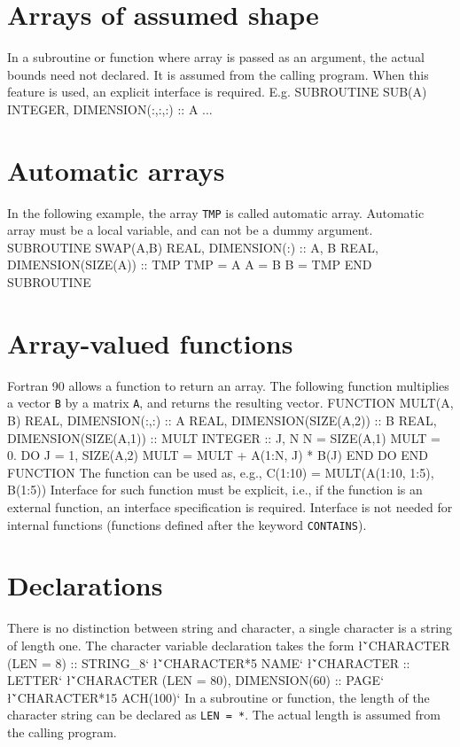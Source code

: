 {\section{Arrays of assumed shape}
In a subroutine or function where array is passed as an argument, 
the actual bounds need not declared.  It is assumed from the calling
program.  When this feature is used, an explicit interface is
required.  E.g.
\ttbg
SUBROUTINE SUB(A)
   INTEGER, DIMENSION(:,:,:) :: A
   ...
\tted

\section{Automatic arrays}
In the following example, the array {\tt TMP} is called automatic array.
Automatic array must be a local variable, and can not be a dummy
argument.
\ttbg
SUBROUTINE SWAP(A,B)
   REAL, DIMENSION(:) :: A, B
   REAL, DIMENSION(SIZE(A)) :: TMP
   TMP = A
   A = B
   B = TMP
END SUBROUTINE
\tted

\section{Array-valued functions}
Fortran 90 allows a function to return an array.   The following function
multiplies a vector {\tt B} by a matrix {\tt A}, and returns the resulting
vector.
\ttbg
FUNCTION MULT(A, B)
   REAL, DIMENSION(:,:) :: A
   REAL, DIMENSION(SIZE(A,2)) :: B
   REAL, DIMENSION(SIZE(A,1)) :: MULT
   INTEGER :: J, N
   N = SIZE(A,1)
   MULT = 0.
   DO J = 1, SIZE(A,2)
      MULT = MULT + A(1:N, J) * B(J)
   END DO
END FUNCTION
\tted
The function can be used as, e.g.,
\ttbg
C(1:10) = MULT(A(1:10, 1:5), B(1:5))
\tted
Interface for such function must be explicit, i.e., if the function is
an external function, an interface specification is required.  Interface
is not needed for internal functions (functions defined after the
keyword {\tt CONTAINS}).



\section{Declarations}
There is no distinction between string and character, a single character
is a string of length one.  The character variable declaration takes the
form
\sms
\l{\v`CHARACTER (LEN = 8) :: STRING_8`}
\l{\v`CHARACTER*5 NAME`}
\l{\v`CHARACTER :: LETTER`}
\l{\v`CHARACTER (LEN = 80), DIMENSION(60) :: PAGE`}
\l{\v`CHARACTER*15 ACH(100)`}
\sms
In a subroutine or function, the length of the character string can be
declared as {\tt LEN = *}.  The actual length is assumed from the calling
program. 

}
